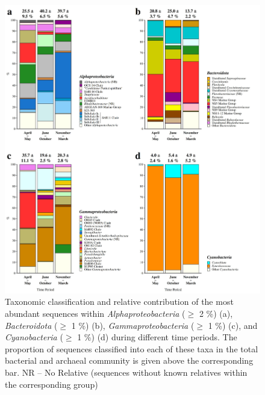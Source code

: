 \documentclass[
  12pt,
]{article}
\begin{document}
\begin{figure}[H]

{\centering \includegraphics[width=1\linewidth]{../results/figures/community_bar_plot_month_taxa} 

}

\caption{Taxonomic classification and relative contribution of the most abundant sequences within \textit{Alphaproteobacteria} ($\geq$ 2 \si{\percent}) (a), \textit{Bacteroidota} ($\geq$ 1 \si{\percent}) (b), \textit{Gammaproteobacteria} ($\geq$ 1 \si{\percent}) (c), and \textit{Cyanobacteria} ($\geq$ 1 \si{\percent}) (d) during different time periods. The proportion of sequences classified into each of these taxa in the total bacterial and archaeal community is given above the corresponding bar. NR -- No Relative (sequences without known relatives within the corresponding group)\label{community_month_taxa}}\label{fig:unnamed-chunk-3}
\end{figure}
\end{document}
